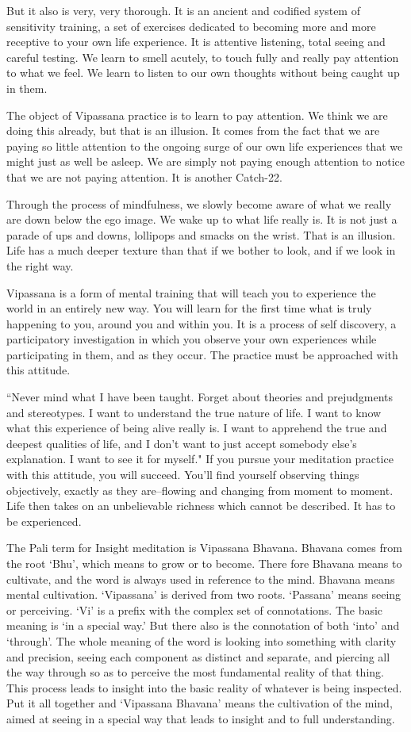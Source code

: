 But it also is very, very thorough. It is an ancient and codified system of
sensitivity training, a set of exercises dedicated to becoming more and more
receptive to your own life experience. It is attentive listening, total seeing
and careful testing. We learn to smell acutely, to touch fully and really pay
attention to what we feel.  We learn to listen to our own thoughts without
being caught up in them.

The object of Vipassana practice is to learn to pay attention. We think we are
doing this already, but that is an illusion. It comes from the fact that we are
paying so little attention to the ongoing surge of our own life experiences that
we might just as well be asleep. We are simply not paying enough attention to
notice that we are not paying attention. It is another Catch-22.

Through the process of mindfulness, we slowly become aware of what we really are
down below the ego image. We wake up to what life really is. It is not just a
parade of ups and downs, lollipops and smacks on the wrist. That is an illusion.
Life has a much deeper texture than that if we bother to look, and if we look in
the right way.

Vipassana is a form of mental training that will teach you to experience the
world in an entirely new way. You will learn for the first time what is truly
happening to you, around you and within you. It is a process of self discovery,
a participatory investigation in which you observe your own experiences while
participating in them, and as they occur. The practice must be approached with
this attitude.

``Never mind what I have been taught. Forget about theories and prejudgments and
stereotypes. I want to understand the true nature of life. I want to know what
this experience of being alive really is. I want to apprehend the true and
deepest qualities of life, and I don't want to just accept somebody else's
explanation. I want to see it for myself." If you pursue your meditation
practice with this attitude, you will succeed. You'll find yourself observing
things objectively, exactly as they are--flowing and changing from moment to
moment. Life then takes on an unbelievable richness which cannot be described.
It has to be experienced.

The Pali term for Insight meditation is Vipassana Bhavana. Bhavana comes from
the root `Bhu', which means to grow or to become. There fore Bhavana means to
cultivate, and the word is always used in reference to the mind. Bhavana means
mental cultivation. `Vipassana' is derived from two roots. `Passana' means
seeing or perceiving. `Vi' is a prefix with the complex set of connotations. The
basic meaning is `in a special way.' But there also is the connotation of both
`into' and `through'. The whole meaning of the word is looking into something
with clarity and precision, seeing each component as distinct and separate, and
piercing all the way through so as to perceive the most fundamental reality of
that thing. This process leads to insight into the basic reality of whatever is
being inspected. Put it all together and `Vipassana Bhavana' means the
cultivation of the mind, aimed at seeing in a special way that leads to insight
and to full understanding.

